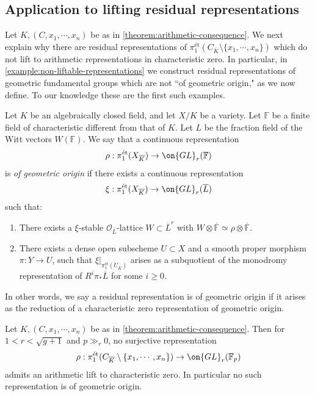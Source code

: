 \subsection{Application to lifting residual representations}
Let $K, (C, x_1, \cdots, x_n)$ be as in
\autoref{theorem:arithmetic-consequence}. We next explain why there are residual
representations of $\pi_1^{\text{\'et}}(C_{\overline{K}}\setminus\{x_1, \cdots,
x_n\})$ which do not lift to arithmetic representations in characteristic zero.
In particular, in \autoref{example:non-liftable-representations}
we construct residual representations of geometric
fundamental groups which are not ``of geometric origin," as we now define. To our knowledge these are the first such examples.
\begin{definition}
\notready
Let $K$ be an algebraically closed field, and let $X/K$ be a variety. Let $\mathbb{F}$ be a finite field of characteristic different from that of $K$. Let $L$ be the fraction field of the Witt vectors $W(\mathbb{F})$. We say that a continuous representation $$\rho: \pi_1^{\text{\'et}}(X_{\overline{K}})\to \on{GL}_r(\mathbb{F})$$ is \emph{of geometric origin} if there exists a continuous representation $$\xi: \pi_1^{\text{\'et}}(X_{\overline{K}})\to \on{GL}_r(\overline{L})$$ such that:
\begin{enumerate}
\item There exists a $\xi$-stable
	$\mathscr{O}_{\overline{L}}$-lattice $W\subset \overline{L}^r$ with
	$W\otimes \overline{\mathbb{F}}\simeq \rho \otimes
	\overline{\mathbb{F}}$.
\item There exists a dense open subscheme $U\subset X$ and a smooth proper morphism $\pi: Y\to U$, such that $\xi|_{\pi_1^{\text{\'et}}(U_{\overline{K}})}$ arises as a subquotient of the monodromy representation of $R^i\pi_*\overline{L}$ for some $i\geq 0.$
\end{enumerate}
\end{definition}
In other words, we say a residual representation is of geometric origin if it
arises as the reduction of a characteristic zero representation of geometric
origin.
\begin{corollary}
\notready\label{corollary:lifting-and-geometric-origin}
	Let $K, (C, x_1, \cdots, x_n)$ be as in \autoref{theorem:arithmetic-consequence}. Then for $1<r<\sqrt{g+1}$ and  $p\gg_r 0$, no surjective representation
	$$\rho: \pi_1^{\text{\'et}}(C_{\overline{K}}\setminus\{x_1, \cdots, x_n\})\to \on{GL}_r(\mathbb{F}_p)$$ admits an arithmetic lift to characteristic zero. In particular no such representation is of geometric origin.
\end{corollary}
